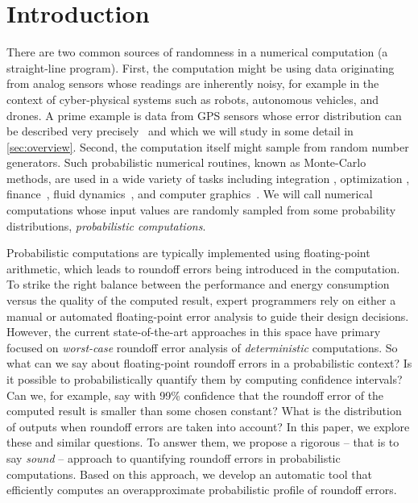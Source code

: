 \section{Introduction}
\label{sec:introduction}

There are two common sources of randomness in a numerical computation (\ie a
straight-line program). First, the computation might be using data originating
from analog sensors whose readings are inherently noisy, for example in the
context of cyber-physical systems such as robots, autonomous vehicles, and
drones.  A prime example is data from GPS sensors whose error distribution can be described very precisely~\cite{bornholt2014uncertain} and which we will study in some detail in \cref{sec:overview}.
Second, the computation itself might sample from random number
generators. Such probabilistic numerical routines, known as Monte-Carlo
methods, are used in a wide variety of tasks including integration 
\cite{press1990recursive,lepage1980vegas},
optimization \cite{press1988numerical}, finance~\cite{glasserman2013monte}, fluid
dynamics~\cite{landau2014guide}, and computer graphics~\cite{kajiya1986rendering}.  We will call
 numerical computations whose input values are randomly sampled from
some probability distributions, \emph{probabilistic computations}.  

Probabilistic computations are typically implemented using
floating-point arithmetic, which leads to roundoff errors being introduced in
the computation. To strike the right balance between the performance
and energy consumption versus the quality of the computed result, expert
programmers rely on either a manual or automated floating-point error analysis
to guide their design decisions. However, the current state-of-the-art
approaches in this space have primary focused on \emph{worst-case} roundoff error
analysis of \emph{deterministic} computations.  So what can we say about
floating-point roundoff errors in a probabilistic context? Is it possible to
probabilistically quantify them by computing confidence intervals?  Can we, for
example, say with 99\% confidence that the roundoff error of the computed
result is smaller than some chosen constant?  What is the distribution of
outputs when roundoff errors are taken into account? In this paper, we explore these and similar questions.  To answer them, we propose a rigorous -- that is to say \emph{sound} -- approach to quantifying
roundoff errors in probabilistic computations. Based on this
approach, we develop an automatic tool that efficiently computes an overapproximate
probabilistic profile of roundoff errors.

